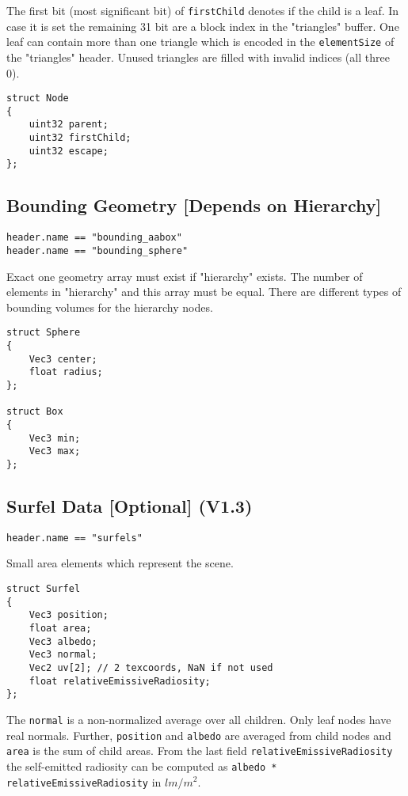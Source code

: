 \documentclass[english,10pt,a4paper,twocolumn,colorscheme=green]{orarticle}
\begin{document}
	The first bit (most significant bit) of \lstinline|firstChild| denotes if the child is a leaf. In case it is set the remaining 31 bit are a block index in the "triangles" buffer. One leaf can contain more than one triangle which is encoded in the \lstinline|elementSize| of the "triangles" header. Unused triangles are filled with invalid indices (all three 0).
	\begin{lstlisting}
struct Node
{
	uint32 parent;
	uint32 firstChild;
	uint32 escape;
};
	\end{lstlisting}
	
	\subsection{Bounding Geometry [Depends on Hierarchy]}
	\lstinline|header.name == "bounding_aabox"|\\
	\lstinline|header.name == "bounding_sphere"|
	
	Exact one geometry array must exist if "hierarchy" exists. The number of elements in "hierarchy" and this array must be equal. There are different types of bounding volumes for the hierarchy nodes.
	\begin{lstlisting}
struct Sphere
{
	Vec3 center;
	float radius;
};

struct Box
{
	Vec3 min;
	Vec3 max;
};
	\end{lstlisting}
	
	
	\subsection{Surfel Data [Optional] (V1.3)}
	\lstinline|header.name == "surfels"|
	
	Small area elements which represent the scene.
	\begin{lstlisting}
struct Surfel
{
	Vec3 position;
	float area;
	Vec3 albedo;
	Vec3 normal;
	Vec2 uv[2]; // 2 texcoords, NaN if not used
	float relativeEmissiveRadiosity;
};
	\end{lstlisting}
	The \lstinline|normal| is a non-normalized average over all children. Only leaf nodes have real normals. Further, \lstinline|position| and \lstinline|albedo| are averaged from child nodes and \lstinline|area| is the sum of child areas. From the last field \lstinline|relativeEmissiveRadiosity| the self-emitted radiosity can be computed as \lstinline|albedo * relativeEmissiveRadiosity| in $lm/m^2$.
	
\end{document}
